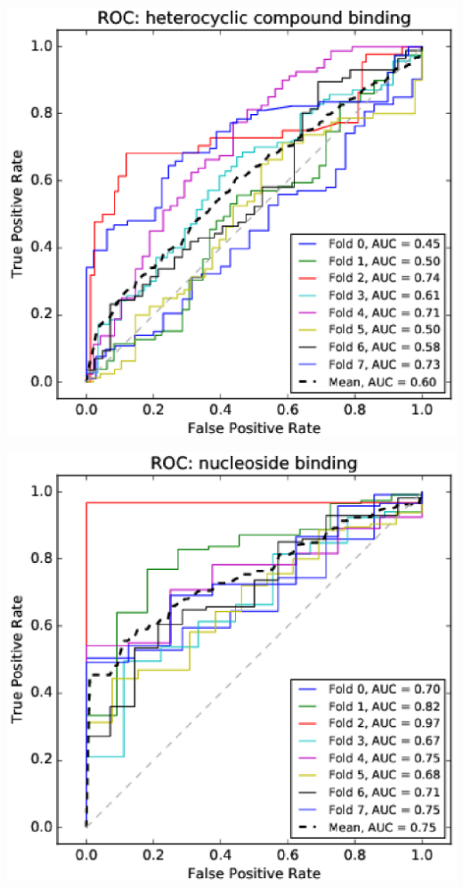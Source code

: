 \documentclass[11pt,twoside,a4paper]{book}
\newenvironment{Figure}
  {\par\medskip\noindent\minipage{\linewidth}}
  {\endminipage\par\medskip}
\begin{document}
\begin{multicols}{2}
\begin{Figure}\begin{center}\includegraphics[width=\linewidth]{figures/roc_heterocyclic_compound_binding}\label{fig:roc_heterocyclic_compound_binding}\end{center}\end{Figure}
\begin{Figure}\begin{center}\includegraphics[width=\linewidth]{figures/roc_nucleoside_binding}\label{fig:roc_nucleoside_binding}\end{center}\end{Figure}

\end{multicols}
\end{document}
